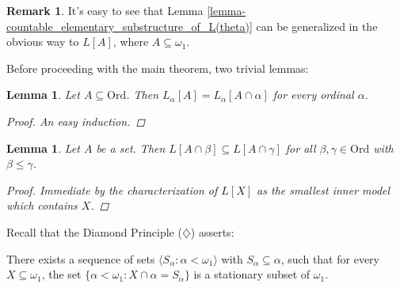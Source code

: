 \documentclass[11pt,a4paper]{report}
\newtheorem{lemma}[theorem]{Lemma}
\theoremstyle{definition}
\newtheorem*{remark}{Remark}
\theoremstyle{num.custom-title}
\theoremstyle{custom-title}
\DeclareMathOperator{\sse}{\subseteq}
\newcommand{\Ord}{\mathrm{Ord}}
\begin{document}
\begin{remark}
It's easy to see that Lemma \ref{lemma-countable_elementary_substructure_of_L(theta)} can be generalized in the obvious way to $L[A]$, where $A \sse \omega_1$.
\end{remark}

Before proceeding with the main theorem, two trivial lemmas:

\begin{lemma}\label{lemma-constructibility_relative_to_initial_segment}
Let $A \sse \Ord$. Then $L_\alpha[A] = L_\alpha [A \cap \alpha]$ for every ordinal $\alpha$.
\begin{proof}
An easy induction.
\end{proof}
\end{lemma}

\begin{lemma}\label{lemma-constructibility_relative_to_different_sets}
Let $A$ be a set. 
Then $L[A \cap \beta] \sse L[A \cap \gamma]$ for all $\beta, \gamma \in \Ord$ with $\beta \leq \gamma$.
\begin{proof}
Immediate by the characterization of $L[X]$ as the smallest inner model which contains $X$.
\end{proof}
\end{lemma}

Recall that the Diamond Principle ($\diamondsuit$) asserts: 
\begin{center}
There exists a sequence of sets $\langle S_\alpha : \alpha < \omega_1 \rangle$ with $S_\alpha \sse \alpha$, such that for every $X \sse \omega_1$, the set $\{\alpha < \omega_1 : X \cap \alpha = S_\alpha \}$ is a stationary subset of $\omega_1$.
\end{center}
\end{document}
